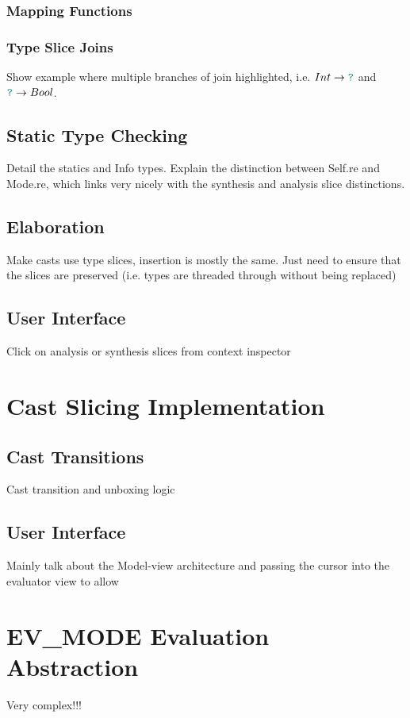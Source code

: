 \subsubsection{Mapping Functions}
\subsubsection{Type Slice Joins}
Show example where multiple branches of join highlighted, i.e. $Int \to {\color{teal}\texttt{?}}$ and ${\color{teal}\texttt{?}} \to Bool$.

\subsection{Static Type Checking}\label{sec:TypeChecking}
Detail the statics and Info types. Explain the distinction between Self.re and Mode.re, which links very nicely with the synthesis and analysis slice distinctions.

\subsection{Elaboration}\label{sec:Elaboration}
Make casts use type slices, insertion is mostly the same. Just need to ensure that the slices are preserved (i.e. types are threaded through without being replaced)

\subsection{User Interface}
Click on analysis or synthesis slices from context inspector

\section{Cast Slicing Implementation}\label{sec:CastSlicingImplementation}
\subsection{Cast Transitions}

Cast transition and unboxing logic

\subsection{User Interface}
Mainly talk about the Model-view architecture and passing the cursor into the evaluator view to allow 


\section{EV\_MODE Evaluation Abstraction}
Very complex!!!

